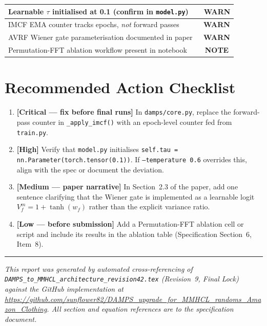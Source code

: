 \documentclass[12pt,a4paper]{article}
\newcommand{\WARN}{\textcolor{warnambr}{\ding{115}~\textbf{WARN}}}
\newcommand{\INFO}{\textcolor{infoblue}{\ding{117}~\textbf{NOTE}}}
\begin{document}
\begin{longtable}{|p{9.2cm}|c|}
  Learnable $\tau$ initialised at 0.1 (confirm in \texttt{model.py})          & \WARN \\
  \hline
  IMCF EMA counter tracks epochs, \emph{not} forward passes                    & \WARN \\
  \hline
  AVRF Wiener gate parameterisation documented in paper                         & \WARN \\
  \hline
  Permutation-FFT ablation workflow present in notebook                         & \INFO \\
  \hline

\end{longtable}

\section*{Recommended Action Checklist}

\begin{enumerate}[label=\textbf{\arabic*.}, leftmargin=2em]

  \item \textbf{[Critical — fix before final runs]} In \texttt{damps/core.py},
    replace the forward-pass counter in \texttt{\_apply\_imcf()} with an
    epoch-level counter fed from \texttt{train.py}.

  \item \textbf{[High]} Verify that \texttt{model.py} initialises
    \texttt{self.tau = nn.Parameter(torch.tensor(0.1))}.  If
    \texttt{--temperature 0.6} overrides this, align with the spec or document
    the deviation.

  \item \textbf{[Medium — paper narrative]} In Section~2.3 of the paper, add
    one sentence clarifying that the Wiener gate is implemented as a learnable
    logit $V^m_f = 1 + \tanh(w_f)$ rather than the explicit variance ratio.

  \item \textbf{[Low — before submission]} Add a Permutation-FFT ablation cell
    or script and include its results in the ablation table (Specification
    Section~6, Item~8).

\end{enumerate}

\vspace{2em}
\hrule
\vspace{0.5em}
\noindent\small\textit{This report was generated by automated cross-referencing of
\texttt{DAMPS\_to\_MMHCL\_architecture\_revision42.tex} (Revision~9, Final Lock)
against the GitHub implementation at
\url{https://github.com/sunflower82/DAMPS_upgrade_for_MMHCL_randoms_Amazon_Clothing}.
All section and equation references are to the specification document.}
\end{document}
